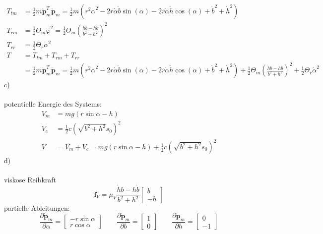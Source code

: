 \begin{align*}
	T_{tm} &= \frac{1}{2}m\dot{\textbf{p}}_m^T \dot{\textbf{p}}_m = \frac{1}{2} m \left( r^2\dot{\alpha}^2 -2r\dot{\alpha}\dot{b}\sin\left(\alpha\right) - 2r\dot{\alpha}\dot{h}\cos\left(\alpha\right) + \dot{b}^2 + \dot{h}^2\right) \\
	T_{rm} &= \frac{1}{2} \Theta_m\dot{\varphi}^2 = \frac{1}{2} \Theta_m \left( \frac{\dot{h}b - h\dot{b}}{b^2 + h^2}\right)^2 \\
	T_{rr} &= \frac{1}{2}\Theta_r\dot{\alpha}^2 \\
	T &= T_{tm} + T_{rm} + T_{rr} \\
	  &= \frac{1}{2}m\dot{\textbf{p}}_m^T \dot{\textbf{p}}_m = \frac{1}{2} m \left( r^2\dot{\alpha}^2 -2r\dot{\alpha}\dot{b}\sin\left(\alpha\right) - 2r\dot{\alpha}\dot{h}\cos\left(\alpha\right) + \dot{b}^2 + \dot{h}^2\right) 
	  + \frac{1}{2} \Theta_m \left( \frac{\dot{h}b - h\dot{b}}{b^2 + h^2}\right)^2 + \frac{1}{2}\Theta_r\dot{\alpha}^2
\end{align*}
\newpage
\noindent
c) \\ \\
potentielle Energie des Systems:
\begin{align*}
	V_m &= mg\left(r\sin\alpha - h\right) \\
	V_c &= \frac{1}{2} c \left(\sqrt{b^2 + h^2} s_0\right)^2 \\
	V &= V_m + V_c = mg\left(r\sin\alpha - h\right) + \frac{1}{2} c \left(\sqrt{b^2 + h^2} s_0\right)^2
\end{align*}
d) \\ \\
viskose Reibkraft
\[
	\textbf{f}_V = \mu_V \frac{\dot{h}b - h\dot{b}}{b^2 + h^2} \left[ \begin{matrix}
	b \\ -h
	\end{matrix}\right]
\]
partielle Ableitungen:
\[
	\frac{\partial \dot{\textbf{p}}_m}{\partial \alpha}  = \left[ \begin{matrix}
		-r\sin\alpha \\ r\cos\alpha
	\end{matrix}\right] \qquad \frac{\partial \dot{\textbf{p}}_m}{\partial b} = \left[ \begin{matrix}
	 1 \\ 0
	\end{matrix}\right] \qquad \frac{\partial \dot{\textbf{p}}_m}{\partial h} = \left[ \begin{matrix}
	0 \\ -1
	\end{matrix}\right]
\]
